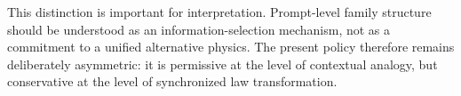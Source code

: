 This distinction is important for interpretation. Prompt-level family structure should be understood as an information-selection mechanism, not as a commitment to a unified alternative physics. The present policy therefore remains deliberately asymmetric: it is permissive at the level of contextual analogy, but conservative at the level of synchronized law transformation.
